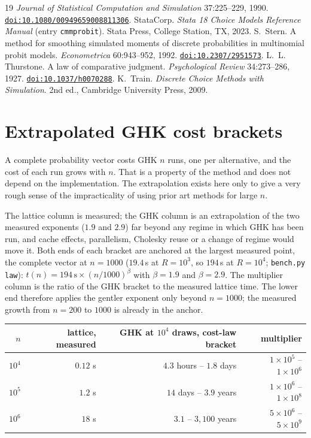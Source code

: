 \documentclass[11pt]{article}
\begin{document}
\begin{thebibliography}{19}
\emph{Journal of Statistical Computation and Simulation} 37:225--229, 1990.
\href{https://doi.org/10.1080/00949659008811306}{\nolinkurl{doi:10.1080/00949659008811306}}.
 StataCorp.
\emph{Stata 18 Choice Models Reference Manual} (entry
\texttt{cmmprobit}). Stata Press, College Station, TX, 2023.
 S.~Stern.
A method for smoothing simulated moments of discrete probabilities in
multinomial probit models. \emph{Econometrica} 60:943--952, 1992.
\href{https://doi.org/10.2307/2951573}{\nolinkurl{doi:10.2307/2951573}}.
 L.~L. Thurstone.
A law of comparative judgment. \emph{Psychological Review} 34:273--286, 1927.
\href{https://doi.org/10.1037/h0070288}{\nolinkurl{doi:10.1037/h0070288}}.
 K.~Train.
\emph{Discrete Choice Methods with Simulation}. 2nd ed., Cambridge University Press, 2009.
\end{thebibliography}
\appendix
\section{Extrapolated GHK cost brackets}\label{app:extrap}

A complete probability vector costs GHK $n$ runs, one per alternative,
and the cost of each run grows with $n$. That is a property of the
method and does not depend on the implementation. The extrapolation
exists here only to give a very rough sense of the impracticality of
using prior art methods for large $n$.

The lattice column is measured; the GHK column is an
extrapolation of the two measured exponents ($1.9$ and $2.9$) far
beyond any regime in which GHK has been run, and cache effects,
parallelism, Cholesky reuse or a change of regime would move it. Both
ends of each bracket are anchored at the largest measured point, the
complete vector at $n=1000$ ($19.4$\,s at $R=10^3$, so $194$\,s at
$R=10^4$; \texttt{bench.py law}):
$t(n)=194\,\mathrm{s}\times(n/1000)^{\beta}$ with $\beta=1.9$ and
$\beta=2.9$. The multiplier column is the ratio of the GHK bracket to
the measured lattice time. The lower end therefore applies the gentler exponent only
beyond $n=1000$; the measured growth from $n=200$ to $1000$ is already in
the anchor.

\begin{center}\small
\begin{tabular}{rrrr}
\toprule
$n$ & lattice, measured & GHK at $10^4$ draws, cost-law bracket & multiplier \\
\midrule
$10^4$ & $0.12$ s & $4.3$ hours -- $1.8$ days & $1\times10^{5}$ -- $1\times10^{6}$ \\
$10^5$ & $1.2$ s & $14$ days -- $3.9$ years & $1\times10^{6}$ -- $1\times10^{8}$ \\
$10^6$ & $18$ s & $3.1$ -- $3{,}100$ years & $5\times10^{6}$ -- $5\times10^{9}$ \\
\bottomrule
\end{tabular}
\end{center}
\end{document}
